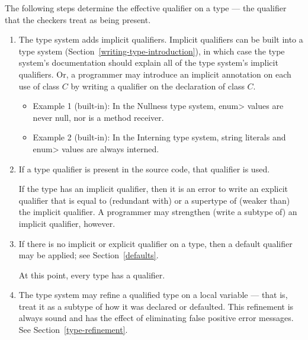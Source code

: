   The following steps determine the effective
qualifier on a type --- the qualifier that the checkers treat as being present.

\begin{enumerate}
\item
  The type system adds implicit qualifiers.  Implicit qualifiers can be
  built into a type system (Section~\ref{writing-type-introduction}), in
  which case the type system's documentation should explain all of the type
  system's implicit qualifiers.  Or, a programmer may introduce an implicit
  annotation on each use of class $C$ by writing a qualifier on the
  declaration of class $C$.

\begin{itemize}
\item
  Example 1 (built-in):  In the Nullness type system,
  \<enum> values are never null, nor is a method receiver.
\item
  Example 2 (built-in):  In the Interning type system, string literals
  and \<enum> values are always interned.
\end{itemize}

\item
  If a type qualifier is present in the source code, that qualifier is used.

  If the type has an implicit qualifier, then it is an error to write an
  explicit qualifier that is equal to (redundant with) or a supertype of
  (weaker than) the implicit qualifier.  A programmer may strengthen
  (write a subtype of) an implicit qualifier, however.

\item
  If there is no implicit or explicit qualifier on a type, then a default
  qualifier may be applied; see Section~\ref{defaults}.

  \smallskip

  At this point, every type has a qualifier.

\item
  The type system may refine a qualified type on a local variable --- that
  is, treat it as a subtype of how it was declared or defaulted.  This
  refinement is always sound and has the effect of eliminating false
  positive error messages.  See Section~\ref{type-refinement}.


\end{enumerate}



